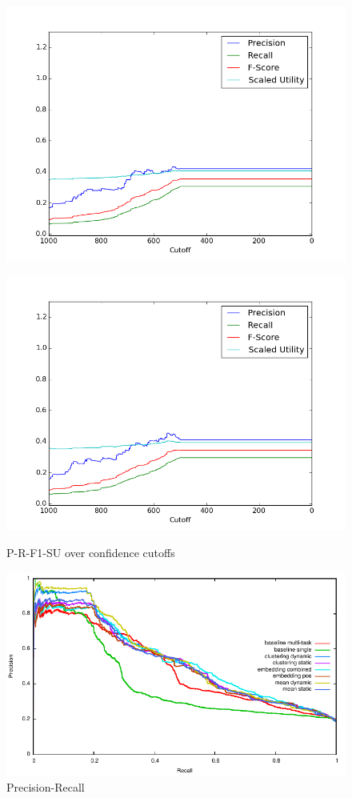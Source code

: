 \documentclass{article}
\begin{document}
{{\begin{figure}[h!]
\begin{minipage}{.25\textwidth}
  \includegraphics[width=1\linewidth]{fig/official/f_clust_stat.png}
  \label{fig:clust_stat}
\end{minipage}%
\begin{minipage}{.25\textwidth}
  \centering
  \includegraphics[width=1\linewidth]{fig/official/f_clust_dyn.png}
  \label{fig:clust_dyn}
\end{minipage}
\label{officialruns}
\caption{P-R-F1-SU over confidence cutoffs}
\end{figure}


\begin{figure}[h!]
\centering
\includegraphics[width=.5\textwidth]{fig/pr/overlapped.pdf}
\caption{Precision-Recall}
\label{precrecall}
\end{figure}

}}
\end{document}
